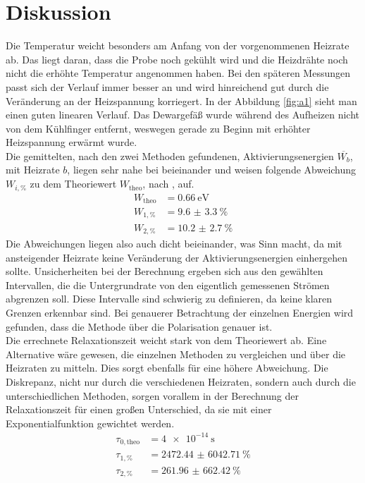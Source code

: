 \section{Diskussion}


Die Temperatur weicht besonders am Anfang von der vorgenommenen Heizrate ab. Das liegt daran, dass die Probe noch
gekühlt wird und die Heizdrähte noch nicht die erhöhte Temperatur angenommen haben. Bei den späteren Messungen passt sich der Verlauf immer besser an
und wird hinreichend gut durch die Veränderung an der Heizspannung korriegert. In der Abbildung \ref{fig:a1} sieht man einen guten linearen Verlauf.
Das Dewargefäß wurde während des Aufheizen nicht von dem Kühlfinger entfernt, weswegen gerade zu Beginn mit erhöhter Heizspannung erwärmt wurde.
\\
\newline
Die gemittelten, nach den zwei Methoden gefundenen, Aktivierungsenergien $\overline{W_{b}}$, mit Heizrate $b$,  liegen sehr nahe bei beieinander und weisen folgende Abweichung $W_{i,\%}$ zu dem Theoriewert $W_{\text{theo}}$, nach \cite{https://doi.org/10.1002/pssb.2220610223}, auf.
\begin{align*}
    W_{\text{theo}} &= \SI{0.66}{\electronvolt} \\
    W_{1,\%} &= \SI{9.6(33)}{\percent}  \\
    W_{2,\%} &= \SI{10.2(27)}{\percent}
\end{align*}
Die Abweichungen liegen also auch dicht beieinander, was Sinn macht, da mit ansteigender Heizrate keine Veränderung der Aktivierungsenergien einhergehen sollte.
Unsicherheiten bei der Berechnung ergeben sich aus den gewählten Intervallen, die die Untergrundrate von den eigentlich gemessenen Strömen abgrenzen soll.
Diese Intervalle sind schwierig zu definieren, da keine klaren Grenzen erkennbar sind.
Bei genauerer Betrachtung der einzelnen Energien wird gefunden, dass die Methode über die Polarisation genauer ist.
\\
\newline
Die errechnete Relaxationszeit weicht stark von dem Theoriewert ab. Eine Alternative wäre gewesen, die einzelnen Methoden zu vergleichen und über die Heizraten
zu mitteln. Dies sorgt ebenfalls für eine höhere Abweichung.
Die Diskrepanz, nicht nur durch die verschiedenen Heizraten, sondern auch durch die unterschiedlichen Methoden, sorgen vorallem 
in der Berechnung der Relaxationszeit für einen großen Unterschied, da sie mit einer Exponentialfunktion gewichtet werden.
\begin{align*}
    \tau_{0,\text{theo}} &= \SI{4e-14}{\second} \\
    \tau_{1,\%} &= \SI{2472.44(604271)}{\percent}  \\
    \tau_{2,\%} &= \SI{261.96(66242)}{\percent}
\end{align*}
